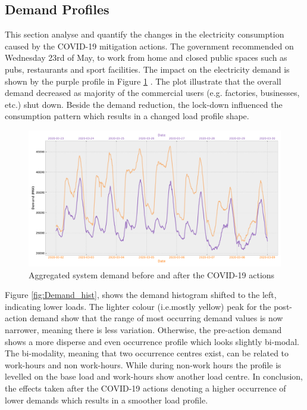 \documentclass[energies,article,submit,moreauthors,pdftex]{Definitions/mdpi}
\begin{document}

\subsection{Demand Profiles}\label{section: Effect on demand profile}

This section analyse and quantify the changes in the electricity consumption caused by the COVID-19 mitigation actions. The government recommended on Wednesday 23rd of May, to work from home and closed public spaces such as pubs, restaurants and sport facilities. The impact on the electricity demand is shown by the purple profile in Figure \ref{fig:demand_profiles} \cite{GovernmentGOV.UK}. The plot illustrate that the overall demand decreased as majority of the commercial users (e.g. factories, businesses, etc.) shut down.
Beside the demand reduction, the lock-down influenced the consumption pattern which results in a changed load profile shape. 

\begin{figure}[H]
\centering
\hspace{-25pt}\includegraphics[width=15 cm]{Graphics/Demand_profiles.pdf}
\caption{Aggregated system demand before and after the COVID-19 actions}\label{fig:demand_profiles}
\end{figure}  

Figure \ref{fig:Demand_hist}, shows the demand histogram shifted to the left, indicating lower loads. The lighter colour (i.e.mostly yellow) peak for the post-action demand show that the range of most occurring demand values is now narrower, meaning there is less variation. Otherwise, the pre-action demand shows a more disperse and even occurrence profile which looks slightly bi-modal. The bi-modality, meaning that two occurrence centres exist, can be related to work-hours and non work-hours. While during non-work hours the profile is levelled on the base load and work-hours show another load centre. In conclusion, the effects taken after the COVID-19 actions denoting a higher occurrence of lower demands which results in a smoother load profile.
\end{document}
